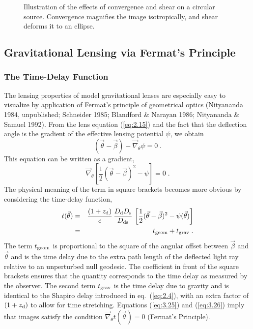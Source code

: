 \documentclass[a4paper,10pt]{article} %
\begin{document}
\begin{figure}[ht] %
\begin{center}
\begin{minipage}[t]{0.6\hsize}
\end{minipage}
\end{center}
\caption{Illustration of the effects of convergence and shear on a
  circular source. Convergence magnifies the image isotropically, and
  shear deforms it to an ellipse.}
\label{NB:fig3.1}
\end{figure}

\subsection{Gravitational Lensing via Fermat's Principle}
\label{NB:subsect3.3}

\subsubsection{The Time-Delay Function}
\label{NB:subsubsect3.3.1}

The lensing properties of model gravitational lenses are especially
easy to visualize by application of Fermat's principle of geometrical
optics (Nityananda 1984, unpublished; Schneider 1985; Blandford \&
Narayan 1986; Nityananda \& Samuel 1992). From the lens equation
(\ref{eq:2.15}) and the fact that the deflection angle is the gradient
of the effective lensing potential $\psi$, we obtain
\begin{equation}
  (\vec\theta-\vec\beta)-\vec\nabla_\theta\psi = 0\;.
\label{eq:3.24}
\end{equation}
This equation can be written as a gradient,
\begin{equation}
  \vec\nabla_\theta
  \left[\frac{1}{2}(\vec\theta-\vec\beta)^2-\psi\right]=0\;.
\label{eq:3.25}
\end{equation}
The physical meaning of the term in square brackets becomes more
obvious by considering the time-delay function,
\begin{eqnarray}
  t(\vec\theta) &=& \frac{(1+z_{\rm d})}{c}\,
  \frac{D_{\rm d}D_{\rm s}}{D_{\rm ds}}\,
  \left[\frac{1}{2}(\vec\theta-\vec\beta)^2-
  \psi(\vec\theta)\right]
  \nonumber\\
  &=& t_{\rm geom} + t_{\rm grav}\;.\nonumber\\
\label{eq:3.26}
\end{eqnarray}
The term $t_{\rm geom}$ is proportional to the square of the angular
offset between $\vec\beta$ and $\vec\theta$ and is the time delay due
to the extra path length of the deflected light ray relative to an
unperturbed null geodesic. The coefficient in front of the square
brackets ensures that the quantity corresponds to the time delay as
measured by the observer. The second term $t_{\rm grav}$ is the time
delay due to gravity and is identical to the Shapiro delay introduced
in eq.\ (\ref{eq:2.4}), with an extra factor of $(1+z_{\rm d})$ to
allow for time stretching. Equations (\ref{eq:3.25}) and
(\ref{eq:3.26}) imply that images satisfy the condition
$\vec\nabla_\theta t(\vec\theta)=0$ (Fermat's Principle).
\end{document}

